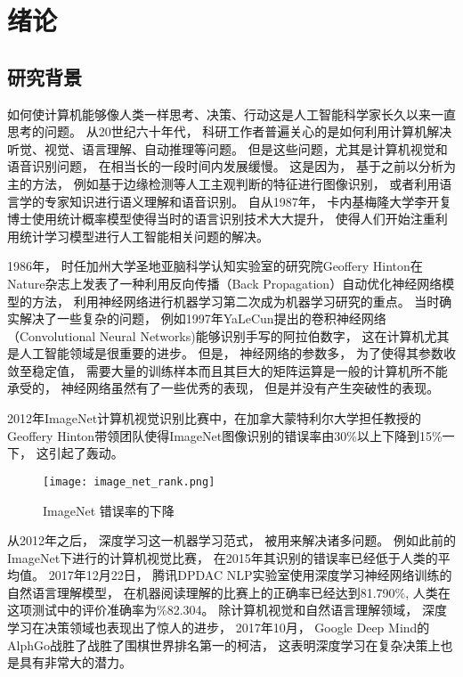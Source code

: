 

\chapter{绪论}

\section{研究背景}

如何使计算机能够像人类一样思考、决策、行动这是人工智能科学家长久以来一直思考的问题。\cite{AIMD} 从20世纪六十年代， 科研工作者普遍关心的是如何利用计算机解决听觉、视觉、语言理解、自动推理等问题。 但是这些问题，尤其是计算机视觉和语音识别问题， 在相当长的一段时间内发展缓慢。 这是因为， 基于之前以分析为主的方法， 例如基于边缘检测等人工主观判断的特征进行图像识别， 或者利用语言学的专家知识进行语义理解和语音识别。 自从1987年， 卡内基梅隆大学李开复博士使用统计概率模型使得当时的语言识别技术大大提升， 使得人们开始注重利用统计学习模型进行人工智能相关问题的解决。 \cite{50_years_ai} \cite{manning2008introduction} \cite{abelson1985structure}

1986年， 时任加州大学圣地亚脑科学认知实验室的研究院Geoffery Hinton在Nature杂志上发表了一种利用反向传播（Back Propagation）自动优化神经网络模型的方法， 利用神经网络进行机器学习第二次成为机器学习研究的重点。 当时确实解决了一些复杂的问题， 例如1997年YaLeCun提出的卷积神经网络（Convolutional Neural Networks)能够识别手写的阿拉伯数字， 这在计算机尤其是人工智能领域是很重要的进步。 但是， 神经网络的参数多， 为了使得其参数收敛至稳定值， 需要大量的训练样本而且其巨大的矩阵运算是一般的计算机所不能承受的， 神经网络虽然有了一些优秀的表现， 但是并没有产生突破性的表现。 

2012年ImageNet计算机视觉识别比赛中，在加拿大蒙特利尔大学担任教授的Geoffery Hinton带领团队使得ImageNet图像识别的错误率由30\%以上下降到15\%一下， 这引起了轰动。 \cite{DBLP:journals/corr/abs-1301-3781} 
\begin{figure}[htbp]
    \centering  %
    \texttt{[image: image\_net\_rank.png]} %
    \caption{ImageNet 错误率的下降} %
    \label{Russakovsky et al. arXiv, 2014} %
\end{figure}


从2012年之后， 深度学习这一机器学习范式， 被用来解决诸多问题。 例如此前的ImageNet下进行的计算机视觉比赛， 在2015年其识别的错误率已经低于人类的平均值。 2017年12月22日， 腾讯DPDAC NLP实验室使用深度学习神经网络训练的自然语言理解模型， 在机器阅读理解的比赛上的正确率已经达到81.790\%, 人类在这项测试中的评价准确率为\%82.304。 除计算机视觉和自然语言理解领域， 深度学习在决策领域也表现出了惊人的进步， 2017年10月， Google Deep Mind的AlphGo战胜了战胜了围棋世界排名第一的柯洁， 这表明深度学习在复杂决策上也是具有非常大的潜力。 

